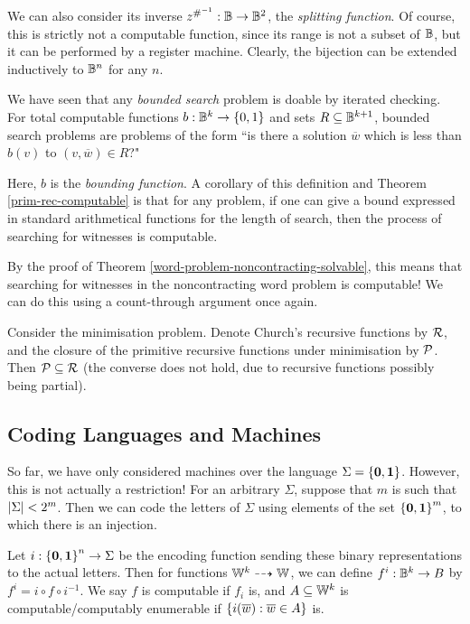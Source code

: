 \documentclass{article}
\begin{document}
We can also consider its inverse $z^{{\#}^{-1}}: \mathbb{B} \to \mathbb{B}^2$, the \textit{splitting function}. Of course, this is strictly not a computable function, since its range is not a subset of $\mathbb{B}$, but it can be performed by a register machine. Clearly, the bijection can be extended inductively to $\mathbb{B}^n$ for any $n$.

\begin{remark}
	We have seen that any \textit{bounded search} problem is doable by iterated checking. For total computable functions $b : \mathbb{B}^{k} \to \left\lbrace 0, 1 \right\rbrace$ and sets $R \subseteq \mathbb{B}^{k+1}$, bounded search problems are problems of the form ``is there a solution $\overline w$ which is less than $b(v)$ to $(v, \overline w) \in R$?"
	    
	Here, $b$ is the \textit{bounding function}. A corollary of this definition and Theorem \ref{prim-rec-computable} is that for any problem, if one can give a bound expressed in standard arithmetical functions for the length of search, then the process of searching for witnesses is computable.
	    
	By the proof of Theorem \ref{word-problem-noncontracting-solvable}, this means that searching for witnesses in the noncontracting word problem is computable! We can do this using a count-through argument once again.
\end{remark}

Consider the minimisation problem. Denote Church's recursive functions by $\mathcal{R}$, and the closure of the primitive recursive functions under minimisation by $\mathcal{P}$. Then $\mathcal{P} \subseteq \mathcal{R}$ (the converse does not hold, due to recursive functions possibly being partial).

\subsection{Coding Languages and Machines}

So far, we have only considered machines over the language $\Sigma = \left\lbrace \textbf{0}, \textbf{1} \right\rbrace$. However, this is not actually a restriction! For an arbitrary $\Sigma$, suppose that $m$ is such that $\left\lvert \Sigma \right\rvert < 2^m$. Then we can code the letters of $\Sigma$ using elements of the set $\left\lbrace \textbf{0}, \textbf{1} \right\rbrace^m$, to which there is an injection.

Let $i : \left\lbrace \textbf{0}, \textbf{1} \right\rbrace^n \to \Sigma$ be the encoding function sending these binary representations to the actual letters. Then for functions $\mathbb{W}^k \dashrightarrow \mathbb{W}$, we can define $f^i: \mathbb{B}^k \to B$ by $f^i = i \circ f \circ i^{-1}$. We say $f$ is computable if $f_i$ is, and $A \subseteq \mathbb{W}^k$ is computable/computably enumerable if $\left\lbrace i(\overline w) : \overline w \in A \right\rbrace$ is.
\end{document}
